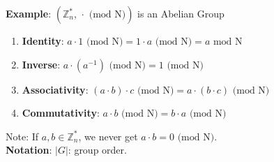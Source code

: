 \documentclass{scribe}
\begin{document}
\noindent\textbf{Example}: $(\mathbb{Z}_n^{*} \text{, } \cdot \text{ (mod N)})$ is an Abelian Group
\begin{enumerate}
    \item \textbf{Identity}: $ a \cdot 1 \text{ (mod N)} = 1 \cdot a \text{ (mod N)} = a \text{ mod N}$
    \item \textbf{Inverse}: $a \cdot (a^{-1}) \text{ (mod N)} = 1 \text{ (mod N)}$
    \item \textbf{Associativity}: $(a \cdot b)\cdot c \text{ (mod N)} = a \cdot (b \cdot c) \text{ (mod N)} $
    \item \textbf{Commutativity}: $a \cdot b \text{ (mod N)} = b \cdot a \text{ (mod N)}$
\end{enumerate}
\indent *Note: If $a,b \in \mathbb{Z}_n^{*}$, we never get $a \cdot b=0 \text{ (mod N)}$.
\vspace{5mm}
\\\noindent\textbf{Notation}: $|G|$: group order.






\lipsum{}



%

\end{document}
